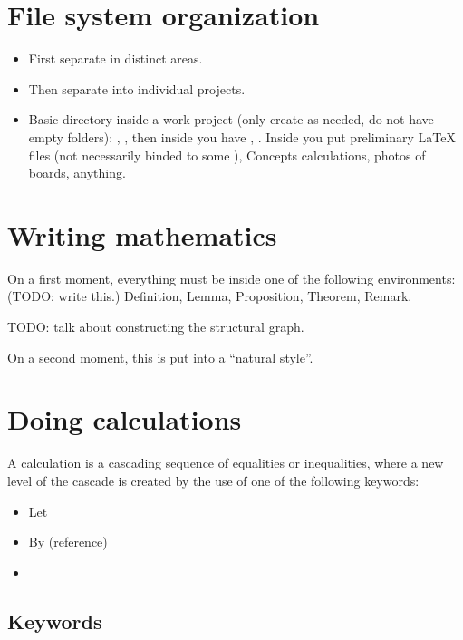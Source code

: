 \section{File system organization}
\begin{itemize}
\item First separate in distinct areas.
\item Then separate into individual projects.
\item Basic directory inside a work project (only create as needed, do not have empty folders): , , then inside  you have , . Inside  you put preliminary LaTeX files (not necessarily binded to some ), Concepts calculations, photos of boards, anything.
\end{itemize}

\section{Writing mathematics}
On a first moment, everything must be inside one of the following environments: (TODO: write this.) Definition, Lemma, Proposition, Theorem, Remark.

TODO: talk about constructing the structural graph.

On a second moment, this is put into a ``natural style''.

\section{Doing calculations}
A calculation is a cascading sequence of equalities or inequalities, where a new level of the cascade is created by the use of one of the following keywords:
\begin{itemize}
\item Let
\item By (reference)
\item 
\end{itemize}

\subsection{Keywords}